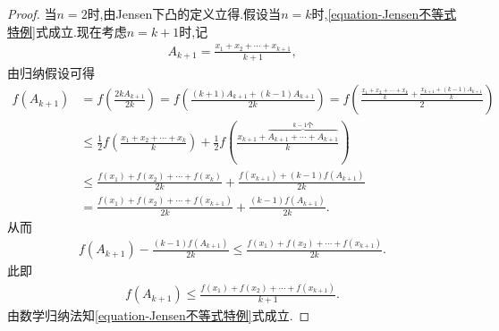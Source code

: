 \documentclass[../../main.tex]{subfiles}%
\begin{document}
\begin{proof}

当$n=2$时,由Jensen下凸的定义立得.假设当$n=k$时,\eqref{equation-Jensen不等式特例}式成立.现在考虑$n=k+1$时,记
\begin{align*}
A_{k+1}=\frac{x_1+x_2+\cdots +x_{k+1}}{k+1},
\end{align*}
由归纳假设可得
\begin{align*}
f\left( A_{k+1} \right) &=f\left( \frac{2kA_{k+1}}{2k} \right) =f\left( \frac{\left( k+1 \right) A_{k+1}+\left( k-1 \right) A_{k+1}}{2k} \right) =f\left( \frac{\frac{x_1+x_2+\cdots +x_k}{k}+\frac{x_{k+1}+\left( k-1 \right) A_{k+1}}{k}}{2} \right) 
\\
&\leqslant \frac{1}{2}f\left( \frac{x_1+x_2+\cdots +x_k}{k} \right) +\frac{1}{2}f\left( \frac{x_{k+1}+\overset{k-1\text{个}}{\overbrace{A_{k+1}+\cdots +A_{k+1}}}}{k} \right) 
\\
&\leqslant \frac{f\left( x_1 \right) +f\left( x_2 \right) +\cdots +f\left( x_k \right)}{2k}+\frac{f\left( x_{k+1} \right) +\left( k-1 \right) f\left( A_{k+1} \right)}{2k}
\\
&=\frac{f\left( x_1 \right) +f\left( x_2 \right) +\cdots +f\left( x_{k+1} \right)}{2k}+\frac{\left( k-1 \right) f\left( A_{k+1} \right)}{2k}.
\end{align*}
从而
\begin{align*}
f\left( A_{k+1} \right) -\frac{\left( k-1 \right) f\left( A_{k+1} \right)}{2k}\leqslant \frac{f\left( x_1 \right) +f\left( x_2 \right) +\cdots +f\left( x_{k+1} \right)}{2k}.
\end{align*}
此即
\begin{align*}
f\left( A_{k+1} \right) \leqslant \frac{f\left( x_1 \right) +f\left( x_2 \right) +\cdots +f\left( x_{k+1} \right)}{k+1}.
\end{align*}
由数学归纳法知\eqref{equation-Jensen不等式特例}式成立.


\end{proof}
\end{document}
